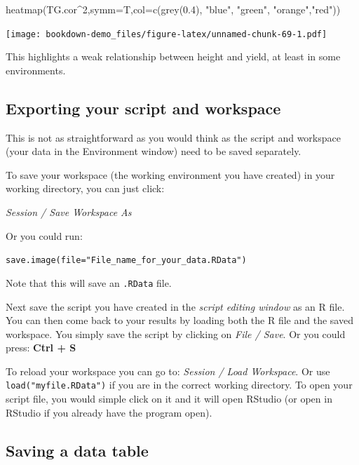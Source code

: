 \documentclass[
]{book}
\newenvironment{Shaded}{\begin{snugshade}}{\end{snugshade}}
\newcommand{\AttributeTok}[1]{\textcolor[rgb]{0.77,0.63,0.00}{#1}}
\newcommand{\DecValTok}[1]{\textcolor[rgb]{0.00,0.00,0.81}{#1}}
\newcommand{\FloatTok}[1]{\textcolor[rgb]{0.00,0.00,0.81}{#1}}
\newcommand{\FunctionTok}[1]{\textcolor[rgb]{0.00,0.00,0.00}{#1}}
\newcommand{\NormalTok}[1]{#1}
\newcommand{\SpecialCharTok}[1]{\textcolor[rgb]{0.00,0.00,0.00}{#1}}
\newcommand{\StringTok}[1]{\textcolor[rgb]{0.31,0.60,0.02}{#1}}
\begin{document}
\begin{Shaded}
\begin{Highlighting}[]
\FunctionTok{heatmap}\NormalTok{(TG.cor}\SpecialCharTok{\^{}}\DecValTok{2}\NormalTok{,}\AttributeTok{symm=}\NormalTok{T,}\AttributeTok{col=}\FunctionTok{c}\NormalTok{(}\FunctionTok{grey}\NormalTok{(}\FloatTok{0.4}\NormalTok{), }\StringTok{"blue"}\NormalTok{, }\StringTok{"green"}\NormalTok{, }\StringTok{"orange"}\NormalTok{,}\StringTok{"red"}\NormalTok{))}
\end{Highlighting}
\end{Shaded}

\texttt{[image: bookdown-demo\_files/figure-latex/unnamed-chunk-69-1.pdf]}

This highlights a weak relationship between height and yield, at least in some environments.

\hypertarget{exporting-your-script-and-workspace}{%
\subsection{Exporting your script and workspace}\label{exporting-your-script-and-workspace}}

This is not as straightforward as you would think as the script and workspace (your data in the Environment window) need to be saved separately.

To save your workspace (the working environment you have created) in your working directory, you can just click:

\emph{Session / Save Workspace As}

Or you could run:

\texttt{save.image(file="File\_name\_for\_your\_data.RData")}

Note that this will save an \texttt{.RData} file.

Next save the script you have created in the \emph{script editing window} as an R file. You can then come back to your results by loading both the R file and the saved workspace. You simply save the script by clicking on \emph{File / Save}.
Or you could press: \textbf{Ctrl + S}

To reload your workspace you can go to: \emph{Session / Load Workspace}. Or use \texttt{load("myfile.RData")} if you are in the correct working directory. To open your script file, you would simple click on it and it will open RStudio (or open in RStudio if you already have the program open).

\hypertarget{saving-a-data-table}{%
\subsection{Saving a data table}\label{saving-a-data-table}}
\end{document}
